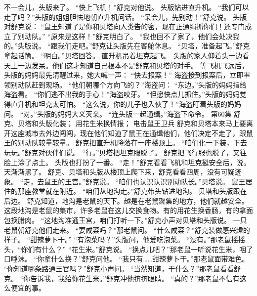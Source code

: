 \documentclass[a4paper,12pt,UTF8,twoside]{ctexbook}
\begin{document}
        不一会儿，头版来了。 
        “快上飞机！”舒克对他说。 
        头版钻进直升机。 
        “我们可以走了吗？”头版的姐姐胆怯地朝直升机问话。 
        “呆会儿，先别动！”舒克说。 
        头版对舒克说： 
        “鼠王知道了是你和贝塔向人类告的密，现在正通缉抓你们！还专门成立了别动队。” 
        “原来是这样！”舒克明白了。 
        “我也回不了家了，他们会处决我的。”头版说。 
        “跟我们走吧。”舒克让头版先在客舱休息。 
        “贝塔，准备起飞。”舒克拿起话筒。 
        “明白。”贝塔回答。 
        直升机吊着坦克起飞。 
        头版的家人仰着头一边看天上一边发呆。他们这才知道自己根本不是舒克和贝塔的对手。 
        等飞机飞远后，头版的妈妈最先清醒过来，她大喊一声： 
        “快去报案！” 
        海盗接到报案后，立即率领别动队赶到现场。 
        “他们朝哪个方向飞的？”海盗问： 
        “东边。”头版的妈妈指给海盗看。 
        “你们逃不出我的手心！”海盗咬牙。 
        “但愿快点儿抓住。”头版的妈妈觉得直升机和坦克太可怕。 
        “这么说，你的儿子也入伙了！”海盗盯着头版的妈妈问。 
        “对。”头版的妈妈大义灭亲。 
        “连头版一起通缉。”海盗下命令。   第60集 
        舒克、贝塔和头版化装； 
        用花生米换情报； 
        电击鼠王卫兵   
        舒克和贝塔本来马上要离开这座城市去外边闯闯，现在他们知道了鼠王在通缉他们，他们决定不走了，跟鼠王的别动队较量较量。 
        舒克把直升机降落在一座楼顶上。 
        “咱们化一下装，下去玩玩。”舒克对伙伴们说。 
        “行。”贝塔把坦克服脱了。 
        舒克把飞行服也脱了，又往脸上涂了点土。 
        头版也打扮了一番。 
        “走！”舒克看看飞机和坦克挺安全后，说。 
        天渐渐黑了。 
        舒克、贝塔和头版从楼顶上爬下来，舒克看看四周，没有可疑迹象。 
        “走，去鼠王的王宫。”舒克说。 
        “咱们也认识认识别动队长。”贝塔说。 
        鼠王居住的那座教堂就在附近。 
        “咱们从地沟走。”舒克带头钻进地沟。 
        贝塔和头版跟在后边。 
        舒克知道，地沟是老鼠的天下。越是在老鼠聚集的地方，他们就越安全。 
        这段地沟是老鼠的集市，许多老鼠在这儿交换食物。有的用花生换香肠，有的拿面包换腊肉。 
        “这地沟准通王宫，咱们打听一下。”舒克小声对贝塔和头版说。 
        一只老鼠朝舒克他们走来。 
        “要咸菜吗？”那老鼠问。 
        “什么咸菜？”舒克装做感兴趣的样子。 
        “甜辣萝卜干。” 
        “有泡菜吗？”头版问，他爱吃泡菜。 
        “没有。”那老鼠摇摇头，“你们有什么？” 
        “花生米。”舒克说。 
        “换点儿吧？”那老鼠一听说花生米，咽了口唾沫。 
        “你拿什么换？”舒克问他。 
        “我只有……甜辣萝卜干。”那老鼠面带难色。 
        “你知道哪条路通王官吗？”舒克小声问。 
        “当然知道，干什么？”那老鼠看看舒克。 
        “你告诉我，我给你花生米。”舒克冲他挤挤眼睛。 
        “真的？”那老鼠不信有这么便宜的事。 
\end{document}
